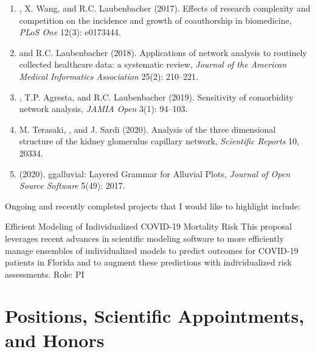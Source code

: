 \documentclass{nihbiosketch}
\begin{document}
\begin{statement}
\begin{enumerate}

\item {}, X. Wang, and R.C. Laubenbacher (2017). Effects of research complexity and competition on the incidence and growth of coauthorship in biomedicine, \emph{PLoS One} 12(3): e0173444.
\item {} and R.C. Laubenbacher (2018). Applications of network analysis to routinely collected healthcare data: a systematic review, \emph{Journal of the American Medical Informatics Association} 25(2): 210--221.
\item {}, T.P. Agresta, and R.C. Laubenbacher (2019). Sensitivity of comorbidity network analysis, \emph{JAMIA Open} 3(1): 94--103.
\item M. Terasaki, , and J. Sardi (2020). Analysis of the three dimensional structure of the kidney glomerulus capillary network, \emph{Scientific Reports} 10, 20334.
\item {} (2020). ggalluvial: Layered Grammar for Alluvial Plots, \emph{Journal of Open Source Software} 5(49): 2017.

\end{enumerate}

\noindent
Ongoing and recently completed projects that I would like to highlight include:

{Efficient Modeling of Individualized COVID-19 Mortality Risk}
{This proposal leverages recent advances in scientific modeling software to more efficiently manage ensembles of individualized models to predict outcomes for COVID-19 patients in Florida and to augment these predictions with individualized risk assessments.}
{Role: PI}

\end{statement}


\section{Positions, Scientific Appointments, and Honors}
\end{document}

